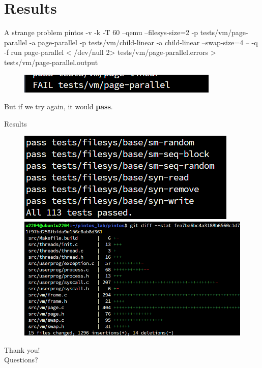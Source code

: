 \documentclass[10pt]{beamer}
\begin{document}
\section{Results}
\begin{frame}[fragile]{A strange problem}
    pintos -v -k -T 60 --qemu  --filesys-size=2 -p tests/vm/page-parallel -a page-parallel -p tests/vm/child-linear -a child-linear --swap-size=4 -- -q  -f run page-parallel < /dev/null 2> tests/vm/page-parallel.errors > tests/vm/page-parallel.output
    \begin{figure}
        \centering
        \includegraphics[width=\linewidth]{figures/result2.png}
    \end{figure}
    But if we try again, it would \textbf{pass}.
\end{frame}
\begin{frame}[fragile]{Results}
    \begin{figure}
        \centering
        \includegraphics[width=0.6\linewidth]{figures/result.png}
        \includegraphics[width=0.8\linewidth]{figures/insert.png}
    \end{figure}
\end{frame}
\begin{frame}[standout]
  \Large Thank you!\\
  Questions?
\end{frame}
\end{document}
